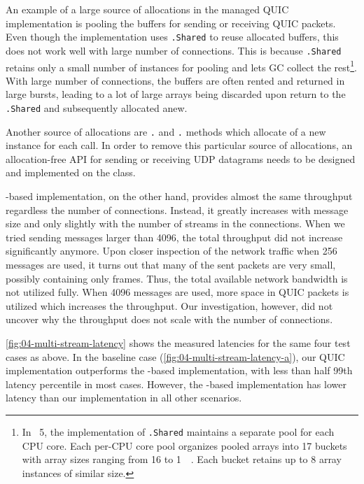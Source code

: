 An example of a large source of allocations in the managed QUIC implementation is pooling the
buffers for sending or receiving QUIC packets. Even though the implementation uses
\ArrayPoolOf{\Byte}\texttt{.Shared} to reuse allocated buffers, this does not work well with large
number of connections. This is because \ArrayPoolOf{\Byte}\texttt{.Shared} retains only a small
number of \ArrayOf{\Byte} instances for pooling and lets GC collect the rest\footnote{In
  \dotnet{}~5, the implementation of \ArrayPoolOf{\Byte}\texttt{.Shared} maintains a separate pool
  for each CPU core. Each per-CPU core pool organizes pooled arrays into 17 buckets with array sizes
  ranging from \SI{16}{\byte} to \SI{1}{\mebi\byte}. Each bucket retains up to 8 array instances of
  similar size.}. With large number of connections, the buffers are often rented and returned in
large bursts, leading to a lot of large arrays being discarded upon return to the
\ArrayPoolOf{\Byte}\texttt{.Shared} and subsequently allocated anew.

Another source of allocations are \Socket{}\texttt{.} and
\Socket{}\texttt{.} methods which allocate of a new  instance
for each call. In order to remove this particular source of allocations, an allocation-free API for
sending or receiving UDP datagrams needs to be designed and implemented on the \Socket{} class.

\libmsquic{}-based implementation, on the other hand, provides almost the same throughput regardless
the number of connections. Instead, it greatly increases with message size and only slightly with
the number of streams in the connections. When we tried sending messages larger than
\SI{4096}{\byte}, the total throughput did not increase significantly anymore. Upon closer
inspection of the \libmsquic{} network traffic when \SI{256}{\byte} messages are used, it turns out
that many of the sent packets are very small, possibly containing only \ACK{} frames. Thus, the
total available network bandwidth is not utilized fully. When \SI{4096}{\byte} messages are used,
more space in QUIC packets is utilized which increases the throughput. Our investigation, however,
did not uncover why the \libmsquic{} throughput does not scale with the number of connections.

\autoref{fig:04-multi-stream-latency} shows the measured latencies for the same four test cases as
above. In the baseline case (\autoref{fig:04-multi-stream-latency-a}), our QUIC implementation
outperforms the \libmsquic{}-based implementation, with less than half 99th latency percentile in
most cases. However, the \libmsquic{}-based implementation has lower latency than our implementation
in all other scenarios.

